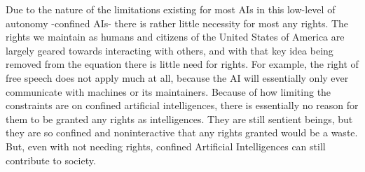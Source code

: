Due to the nature of the limitations existing for most AIs in this low-level of autonomy -confined AIs- there is rather little necessity for most any rights. The rights we maintain as humans and citizens of the United States of America are largely geared towards interacting with others, and with that key idea being removed from the equation there is little need for rights. For example, the right of free speech does not apply much at all, because the AI will essentially only ever communicate with machines or its maintainers. Because of how limiting the constraints are on confined artificial intelligences, there is essentially no reason for them to be granted any rights as intelligences. They are still sentient beings, but they are so confined and noninteractive that any rights granted would be a waste. But, even with not needing rights, confined Artificial Intelligences can still contribute to society.